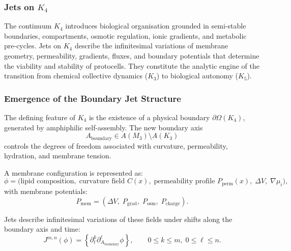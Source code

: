 
\subsubsection{Jets on \texorpdfstring{$K_4$}{K_4}}
\label{sec:jets-k4}

The continuum $K_4$ introduces biological organisation grounded in
semi-stable boundaries, compartments, osmotic regulation, ionic
gradients, and metabolic pre-cycles. Jets on $K_4$ describe the
infinitesimal variations of membrane geometry, permeability, gradients,
fluxes, and boundary potentials that determine the viability and
stability of protocells. They constitute the analytic engine of the
transition from chemical collective dynamics ($K_3$) to biological
autonomy ($K_5$). 


\subsubsection{Emergence of the Boundary Jet Structure}

The defining feature of $K_4$ is the existence of a physical boundary
$\partial\Omega(K_4)$, generated by amphiphilic self-assembly. The new
boundary axis
\[
A_{\mathrm{boundary}} \in A(M_3)\setminus A(K_3)
\]
controls the degrees of freedom associated with curvature, permeability,
hydration, and membrane tension.

A membrane configuration is represented as:
\[
\phi = 
\bigl(
\text{lipid composition},\;
\text{curvature field } C(x),\;
\text{permeability profile } P_{\mathrm{perm}}(x),\;
\Delta V,\;
\nabla \mu_i
\bigr),
\]
with membrane potentials:
\[
P_{\mathrm{mem}} = 
(\Delta V,\; P_{\mathrm{grad}},\; P_{\mathrm{osm}},\; P_{\mathrm{charge}}).
\]

Jets describe infinitesimal variations of these fields under shifts along
the boundary axis and time:
\[
J^{m,n}(\phi)=
\left\{
\partial_t^k\partial_{A_{\mathrm{boundary}}}^\ell \phi
\right\},
\qquad 0\le k\le m,\; 0\le \ell\le n.
\]


